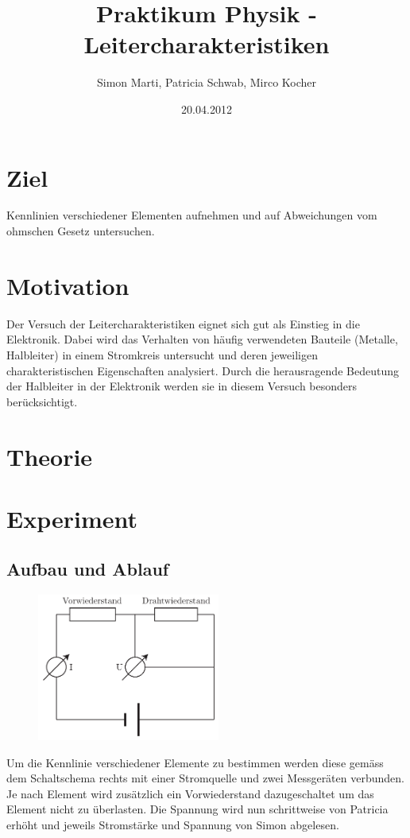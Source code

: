 \documentclass[12pt,a4paper]{article}
\title{Praktikum Physik - Leitercharakteristiken}
\author{Simon Marti, Patricia Schwab, Mirco Kocher}
\date{20.04.2012}
\begin{document}
\maketitle

\section*{Ziel}
Kennlinien verschiedener Elementen aufnehmen und auf Abweichungen vom ohmschen Gesetz untersuchen.

\section*{Motivation}
Der Versuch der Leitercharakteristiken eignet sich gut als Einstieg in die Elektronik. Dabei wird das Verhalten von h\"aufig verwendeten Bauteile (Metalle, Halbleiter) in einem Stromkreis untersucht und deren jeweiligen charakteristischen Eigenschaften analysiert. Durch die herausragende Bedeutung der Halbleiter in der Elektronik werden sie in diesem Versuch besonders ber\"ucksichtigt.

\section*{Theorie}


\section*{Experiment}

\subsection*{Aufbau und Ablauf}
\begin{figure}
\vspace{-15pt}
\centering
\includegraphics[width=6cm]{illustration.pdf}
\end{figure}
Um die Kennlinie verschiedener Elemente zu bestimmen werden diese gem\"ass dem Schaltschema rechts mit einer Stromquelle und zwei Messger\"aten verbunden. Je nach Element wird zus\"atzlich ein Vorwiederstand dazugeschaltet um das Element nicht zu \"uberlasten. Die Spannung wird nun schrittweise von Patricia erh\"oht und jeweils Stromst\"arke und Spannung von Simon abgelesen. 
\end{document}
